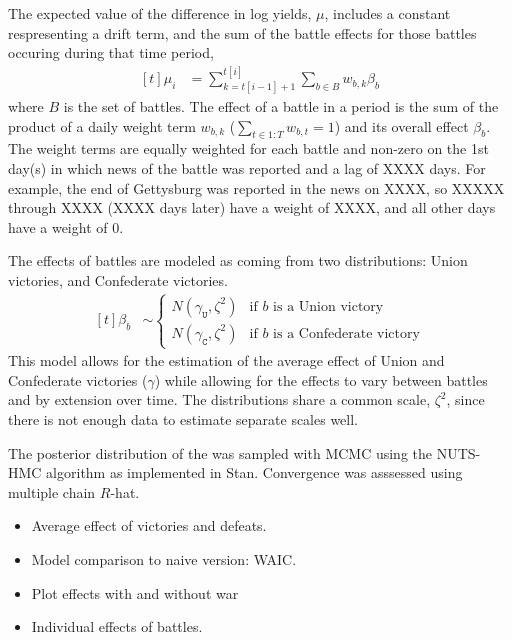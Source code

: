 The expected value of the difference in log yields, $\mu$, includes a constant respresenting a drift term, and the sum of the battle effects for those battles occuring during that time period,
\begin{equation}
  \label{eq:2}
  \begin{aligned}[t]
    \mu_{i} &= \sum_{k = t[i-1] + 1}^{t[i]} \sum_{b \in B} w_{b,k} \beta_{b}
  \end{aligned}
\end{equation}
where $B$ is the set of battles.
The effect of a battle in a period is the sum of the product of a daily weight term $w_{b,k}$ ($\sum_{t \in 1:T} w_{b,t} = 1$) and its overall effect $\beta_{b}$.
The weight terms are equally weighted for each battle and non-zero on the 1st day(s) in which news of the battle was reported and a lag of XXXX days.
For example, the end of Gettysburg was reported in the news on XXXX, so XXXXX through XXXX (XXXX days later) have a weight of XXXX, and all other days have a weight of 0.

The effects of battles are modeled as coming from two distributions: Union victories, and Confederate victories.
\begin{equation}
  \label{eq:4}
  \begin{aligned}[t]
  \beta_{b} &\sim
  \begin{cases}
    N(\gamma_{\mathtt{U}}, \zeta^{2}) & \text{if $b$ is a Union victory} \\
    N(\gamma_{\mathtt{C}}, \zeta^{2}) & \text{if $b$ is a Confederate victory}
  \end{cases}
  \end{aligned}
\end{equation}
This model allows for the estimation of the average effect of Union and Confederate victories ($\gamma$) while allowing for the effects to vary between battles and by extension over time.
The distributions share a common scale, $\zeta^{2}$, since there is not enough data to estimate separate scales well.

The posterior distribution of the was sampled with MCMC using the NUTS-HMC algorithm as implemented in Stan.
Convergence was asssessed using multiple chain $R$-hat.

\begin{itemize}
\item Average effect of victories and defeats.
\item Model comparison to naive version: WAIC.
\item Plot effects with and without war
\item Individual effects of battles.
\end{itemize}

